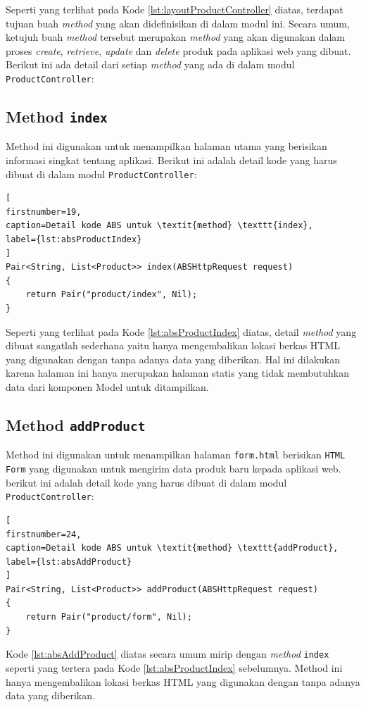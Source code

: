 Seperti yang terlihat pada Kode \ref{lst:layoutProductController} diatas, terdapat tujuan buah \textit{method} yang akan didefinisikan di dalam modul ini. Secara umum, ketujuh buah \textit{method} tersebut merupakan \textit{method} yang akan digunakan dalam proses \textit{create}, \textit{retrieve}, \textit{update} dan \textit{delete} produk pada aplikasi web yang dibuat. Berikut ini ada detail dari setiap \textit{method} yang ada di dalam modul \texttt{ProductController}:

\subsection{Method \texttt{index}}
Method ini digunakan untuk menampilkan halaman utama yang berisikan informasi singkat tentang aplikasi. Berikut ini adalah detail kode yang harus dibuat di dalam modul \texttt{ProductController}:

\begin{lstlisting}[
firstnumber=19,
caption=Detail kode ABS untuk \textit{method} \texttt{index},
label={lst:absProductIndex}
]
Pair<String, List<Product>> index(ABSHttpRequest request)
{
	return Pair("product/index", Nil);
}
\end{lstlisting}

Seperti yang terlihat pada Kode \ref{lst:absProductIndex} diatas, detail \textit{method} yang dibuat sangatlah sederhana yaitu hanya mengembalikan lokasi berkas HTML yang digunakan dengan tanpa adanya data yang  diberikan. Hal ini dilakukan karena halaman ini hanya merupakan halaman statis yang tidak membutuhkan data dari komponen Model untuk ditampilkan.

\subsection{Method \texttt{addProduct}}
Method ini digunakan untuk menampilkan halaman \texttt{form.html} berisikan \texttt{HTML Form} yang digunakan untuk mengirim data produk baru kepada aplikasi web. berikut ini adalah detail kode yang harus dibuat di dalam modul \texttt{ProductController}:

\begin{lstlisting}[
firstnumber=24,
caption=Detail kode ABS untuk \textit{method} \texttt{addProduct},
label={lst:absAddProduct}
]
Pair<String, List<Product>> addProduct(ABSHttpRequest request)
{
	return Pair("product/form", Nil);
}
\end{lstlisting}

Kode \ref{lst:absAddProduct} diatas secara umum mirip dengan \textit{method} \texttt{index} seperti yang tertera pada Kode \ref{lst:absProductIndex} sebelumnya. Method ini hanya mengembalikan lokasi berkas HTML yang digunakan dengan tanpa adanya data yang diberikan. 

